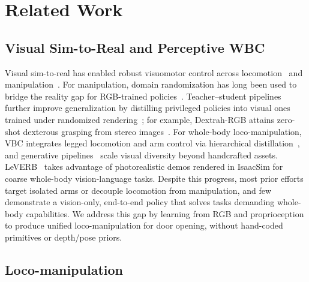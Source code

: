 \section{Related Work}
\label{sec:relatedworks}

\subsection{Visual Sim-to-Real and Perceptive WBC}





Visual sim-to-real has enabled robust visuomotor control across locomotion~\citep{miki2022learning,zhuang2024humanoid,cheng2023parkour,wang2025beamdojo,long2025learning,ren2025vb,xue2025leverb} and manipulation~\citep{sadeghi2016cad2rl,tobin2017domain,peng2018sim,andrychowicz2020learning,akkaya2019solving,handa2023dextreme,yuan2024learning,jiang2024transic,ze2023visual,hansen2021generalization,huang2022spectrum,singh2024dextrah,deng2025graspvla,liu2024visual,zhu2018reinforcement}. For manipulation, domain randomization has long been used to bridge the reality gap for RGB-trained policies~\citep{sadeghi2016cad2rl,tobin2017domain,peng2018sim}. Teacher–student pipelines further improve generalization by distilling privileged policies into visual ones trained under randomized rendering~\citep{singh2024dextrah,deng2025graspvla}; for example, Dextrah-RGB attains zero-shot dexterous grasping from stereo images~\citep{singh2024dextrah}. For whole-body loco-manipulation, VBC integrates legged locomotion and arm control via hierarchical distillation~\citep{liu2024visual}, and generative pipelines~\citep{yu2024learning} scale visual diversity beyond handcrafted assets. LeVERB~\citep{xue2025leverb} takes advantage of photorealistic demos rendered in IsaacSim for coarse whole-body vision-language tasks. Despite this progress, most prior efforts target isolated arms or decouple locomotion from manipulation, and few demonstrate a vision-only, end-to-end policy that solves tasks demanding whole-body capabilities. We address this gap by learning from RGB and proprioception to produce unified loco-manipulation for door opening, without hand-coded primitives or depth/pose priors.


\subsection{Loco-manipulation}

